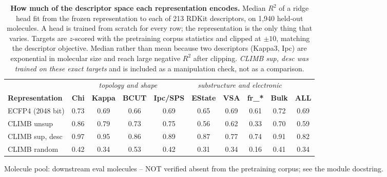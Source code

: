 \begin{table}[h]
\centering
\footnotesize
\setlength{\tabcolsep}{4.5pt}
\caption{\textbf{How much of the descriptor space each representation encodes.} Median $R^2$ of a
ridge head fit from the frozen representation to each of 213 RDKit descriptors, on 1,940
held-out molecules. A head is trained from scratch for every row; the representation is the only
thing that varies. Targets are $z$-scored with the pretraining corpus statistics and clipped at
$\pm10$, matching the descriptor objective. Median rather than mean because two descriptors
(Kappa3, Ipc) are exponential in molecular size and reach large negative $R^2$ after clipping.
\emph{CLIMB sup, desc was trained on these exact targets} and is included as a manipulation check,
not as a comparison.}
\label{tab:descriptor_probe}
\begin{tabular}{@{}l cccc cccc @{\hspace{6pt}}||@{\hspace{6pt}} c@{}}
\toprule
& \multicolumn{4}{c}{\emph{topology and shape}}
& \multicolumn{4}{c}{\emph{substructure and electronic}} & \\
\cmidrule(lr){2-5} \cmidrule(lr){6-9}
\textbf{Representation} & \textbf{Chi} & \textbf{Kappa} & \textbf{BCUT} & \textbf{Ipc/SPS} & \textbf{EState} & \textbf{VSA} & \textbf{fr\_*} & \textbf{Bulk} & \textbf{ALL} \\
\midrule
ECFP4 (2048 bit) & 0.73 & 0.69 & 0.66 & 0.69 & 0.65 & 0.69 & 0.61 & 0.72 & 0.69 \\
CLIMB unsup & 0.86 & 0.79 & 0.73 & 0.75 & 0.56 & 0.62 & 0.33 & 0.70 & 0.59 \\
CLIMB sup, desc & 0.97 & 0.95 & 0.86 & 0.89 & 0.87 & 0.77 & 0.74 & 0.91 & 0.82 \\
CLIMB random & 0.42 & 0.34 & 0.53 & 0.42 & 0.31 & 0.34 & 0.16 & 0.41 & 0.34 \\
\bottomrule
\end{tabular}

\vspace{2pt}
{\footnotesize Molecule pool: downstream eval molecules -- NOT verified absent from the pretraining corpus; see the module docstring.}
\end{table}
